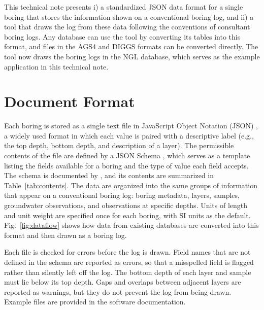\documentclass[Journal,letterpaper,InsideFigs]{ascelike-new}
\begin{document}
This technical note presents i) a standardized JSON data format for a single boring that stores the information shown on a conventional boring log, and ii) a tool that draws the log from these data following the conventions of consultant boring logs. Any database can use the tool by converting its tables into this format, and files in the AGS4 and DIGGS formats can be converted directly. The tool now draws the boring logs in the NGL database, which serves as the example application in this technical note.

\section{Document Format}

Each boring is stored as a single text file in JavaScript Object Notation (JSON) \cite{Bray2017}, a widely used format in which each value is paired with a descriptive label (e.g., the top depth, bottom depth, and description of a layer). The permissible contents of the file are defined by a JSON Schema \cite{Wright2022}, which serves as a template listing the fields available for a boring and the type of value each field accepts. The schema is documented by , and its contents are summarized in Table~\ref{tab:contents}. The data are organized into the same groups of information that appear on a conventional boring log: boring metadata, layers, samples, groundwater observations, and observations at specific depths. Units of length and unit weight are specified once for each boring, with SI units as the default. Fig.~\ref{fig:dataflow} shows how data from existing databases are converted into this format and then drawn as a boring log.

Each file is checked for errors before the log is drawn. Field names that are not defined in the schema are reported as errors, so that a misspelled field is flagged rather than silently left off the log. The bottom depth of each layer and sample must lie below its top depth. Gaps and overlaps between adjacent layers are reported as warnings, but they do not prevent the log from being drawn.  Example files are provided in the software documentation.
\end{document}
